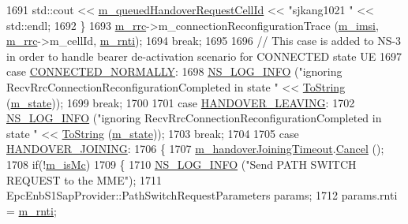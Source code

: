\begin{DoxyCode}
1691         std::cout << \hyperlink{classns3_1_1UeManager_a70f73047c76f4fd1be2cc3665c381704}{m\_queuedHandoverRequestCellId} << \textcolor{stringliteral}{"sjkang1021 "} <<
      std::endl;
1692       \}
1693       \hyperlink{classns3_1_1UeManager_ab4405e9f354c66e7c1a4c95832290f5b}{m\_rrc}->m\_connectionReconfigurationTrace (\hyperlink{classns3_1_1UeManager_a868dda076ecfc1d4202e357c16223d84}{m\_imsi}, \hyperlink{classns3_1_1UeManager_ab4405e9f354c66e7c1a4c95832290f5b}{m\_rrc}->m\_cellId, 
      \hyperlink{classns3_1_1UeManager_a5a72b4fe818f21993bd7f05d7e2c4f83}{m\_rnti});
1694       \textcolor{keywordflow}{break};
1695 
1696     \textcolor{comment}{// This case is added to NS-3 in order to handle bearer de-activation scenario for CONNECTED state UE}
1697     \textcolor{keywordflow}{case} \hyperlink{classns3_1_1UeManager_a2f4085fdd18d7125c27da44a5b8b6808a2a1020dce30f19aa9354ba34b2e7c5e0}{CONNECTED\_NORMALLY}:
1698       \hyperlink{group__logging_gafbd73ee2cf9f26b319f49086d8e860fb}{NS\_LOG\_INFO} (\textcolor{stringliteral}{"ignoring RecvRrcConnectionReconfigurationCompleted in state "} << 
      \hyperlink{namespacens3_a3d1f7e1bec1972e2ae8d64673fcfcd9c}{ToString} (\hyperlink{classns3_1_1UeManager_aaed4b2490297cb912e743084f1a27b08}{m\_state}));
1699       \textcolor{keywordflow}{break};
1700 
1701     \textcolor{keywordflow}{case} \hyperlink{classns3_1_1UeManager_a2f4085fdd18d7125c27da44a5b8b6808ae67953d7b8e117cbd2cab21a1fcde8ad}{HANDOVER\_LEAVING}:
1702       \hyperlink{group__logging_gafbd73ee2cf9f26b319f49086d8e860fb}{NS\_LOG\_INFO} (\textcolor{stringliteral}{"ignoring RecvRrcConnectionReconfigurationCompleted in state "} << 
      \hyperlink{namespacens3_a3d1f7e1bec1972e2ae8d64673fcfcd9c}{ToString} (\hyperlink{classns3_1_1UeManager_aaed4b2490297cb912e743084f1a27b08}{m\_state}));
1703       \textcolor{keywordflow}{break};
1704 
1705     \textcolor{keywordflow}{case} \hyperlink{classns3_1_1UeManager_a2f4085fdd18d7125c27da44a5b8b6808a093669f7255c35aa11645ba004a896ea}{HANDOVER\_JOINING}:
1706       \{
1707         \hyperlink{classns3_1_1UeManager_a441fc4eda92a15be344d70b7039dacd4}{m\_handoverJoiningTimeout}.\hyperlink{classns3_1_1EventId_a993ae94e48e014e1afd47edb16db7a11}{Cancel} ();
1708         \textcolor{keywordflow}{if}(!\hyperlink{classns3_1_1UeManager_a78958b4916253f7e2f9da8fd7f4662b6}{m\_isMc})
1709         \{
1710           \hyperlink{group__logging_gafbd73ee2cf9f26b319f49086d8e860fb}{NS\_LOG\_INFO} (\textcolor{stringliteral}{"Send PATH SWITCH REQUEST to the MME"});
1711           EpcEnbS1SapProvider::PathSwitchRequestParameters params;
1712           params.rnti = \hyperlink{classns3_1_1UeManager_a5a72b4fe818f21993bd7f05d7e2c4f83}{m\_rnti};

\end{DoxyCode}

